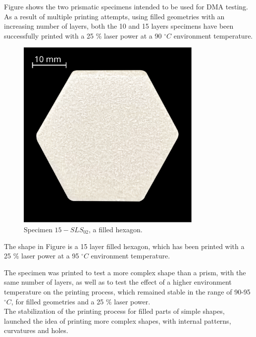\documentclass[a4paper]{article}
\begin{document}
        Figure  shows the two prismatic specimens intended to be used for DMA testing. As a result of multiple 
        printing attempts, using filled geometries with an increasing number of layers, both the 10 and 15 layers specimens have been successfully printed with a 25 \% laser power 
        at a 90 $^{\circ}C$ environment temperature. 

        \begin{figure}[H]
            \centering
            \includegraphics[width=0.8\textwidth]{Pictures/Printed_parts/Fixed/Fixed_New/hexagon.pdf}
            \caption{Specimen $15-SLS_{02}$, a filled hexagon.}
            \label{fig:printed_specimens_filledhexagon}
        \end{figure}

        The shape in Figure  is a 15 layer filled hexagon, which has been printed with a 25 \% laser 
        power at a 95 $^{\circ}C$ environment temperature. 

        The specimen was printed to test a more complex shape than a prism, with the same number of layers, as well as to test the effect of a higher 
        environment temperature on the printing process, which remained stable in the range of 90-95 $^{\circ}C$, for filled geometries and a 25 
        \% laser power. \\ 

        The stabilization of the printing process for filled parts of simple shapes, launched the idea of printing more complex shapes, 
        with internal patterns, curvatures and holes. \\  
\end{document}
